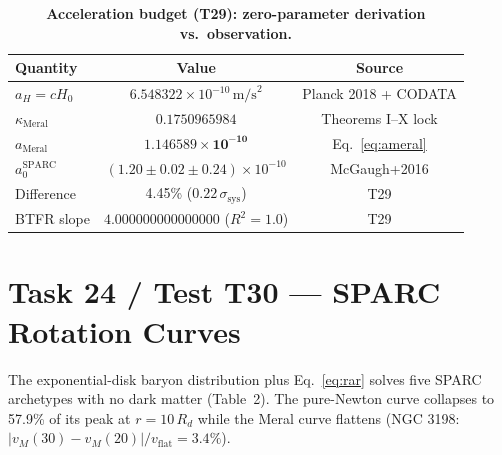 \documentclass[12pt,a4paper]{article}
\begin{document}
\begin{table}[!htbp]
\centering\footnotesize
\setlength{\tabcolsep}{3pt}
\caption{\textbf{Acceleration budget (T29): zero-parameter derivation vs.\ observation.}}
\label{tab:acc}
\vspace{0.1cm}
\begin{tabular}{@{}l|c|c@{}}
\toprule
Quantity & Value & Source \\
\midrule
$a_H = cH_0$ & $6.548322\times 10^{-10}\,\mathrm{m/s}^2$ & Planck 2018 + CODATA \\
$\kappa_{\mathrm{Meral}}$ & $0.1750965984$ & Theorems I--X lock \\
$a_{\mathrm{Meral}}$ & $\mathbf{1.146589\times 10^{-10}}$ & Eq.~\ref{eq:ameral} \\
$a_0^{\mathrm{SPARC}}$ & $(1.20\pm 0.02\pm 0.24)\times 10^{-10}$ & McGaugh+2016 \\
Difference & 4.45\% ($0.22\,\sigma_{\mathrm{sys}}$) & T29 \\
BTFR slope & $4.000000000000000$ ($R^2=1.0$) & T29 \\
\bottomrule
\end{tabular}
\end{table}

\section{Task 24 / Test T30 --- SPARC Rotation Curves}

The exponential-disk baryon distribution plus Eq.~\ref{eq:rar} solves five SPARC
archetypes with no dark matter (Table~2). The pure-Newton curve collapses to
57.9\% of its peak at $r = 10\,R_d$ while the Meral curve flattens
(NGC 3198: $|v_M(30)-v_M(20)|/v_{\mathrm{flat}} = 3.4\%$).
\end{document}
